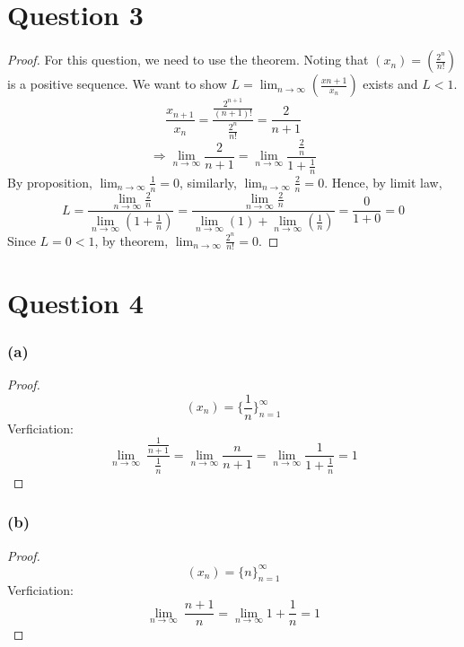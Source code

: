 \documentclass{article}
\begin{document}
\section*{Question 3}
\begin{proof}
    For this question, we need to use the theorem. Noting that \( (x_n) = (\frac{2^n}{n!}) \) is a positive sequence.
    We want to show \( L = \lim_{n \rightarrow \infty} (\frac{x{n + 1}}{x_n}) \) exists and $L < 1$.
    \\
    \[ \frac{x_{n+1}}{x_n} = \frac{\frac{2^{n+1}}{(n+1)!}}{\frac{2^n}{n!}} = \frac{2}{n + 1} \]
    \[ \Rightarrow \lim_{n \rightarrow \infty} \frac{2}{n + 1}  = \lim_{n \rightarrow \infty} \frac{\frac{2}{n}}{1 + \frac{1}{n}} \]
    By proposition, \( \lim_{n \rightarrow \infty} \frac{1}{n} = 0 \), similarly, \( \lim_{n \rightarrow \infty} \frac{2}{n} = 0 \). Hence, by limit law,
    \[ L = \frac{\lim_{n \rightarrow \infty} \frac{2}{n}}{\lim_{n \rightarrow \infty} (1 + \frac{1}{n})} = \frac{\lim_{n \rightarrow \infty} \frac{2}{n}}{\lim_{n \rightarrow \infty} (1) + \lim_{n \rightarrow \infty} (\frac{1}{n})} = \frac{0}{1 + 0} = 0 \]
    Since $L = 0 < 1$, by theorem, \(\lim_{n \rightarrow \infty} \frac{2^n}{n!} = 0\).
\end{proof}

\section*{Question 4}

\subsubsection*{(a)}
\begin{proof}
    \[ (x_n) = \{\frac{1}{n}\}_{n=1}^{\infty} \]
    Verficiation:
    \[ \lim_{n \rightarrow \infty} \ \frac{\frac{1}{n+1}}{\frac{1}{n}} = \lim_{n \rightarrow \infty} \frac{n}{n + 1} = \lim_{n \rightarrow \infty} \frac{1}{1 + \frac{1}{n}} = 1 \]
\end{proof}

\subsubsection*{(b)}
\begin{proof}
    \[ (x_n) = \{n\}_{n=1}^{\infty} \]
    Verficiation:
    \[ \lim_{n \rightarrow \infty} \ \frac{n+1}{n} = \lim_{n \rightarrow \infty} 1 + \frac{1}{n} = 1 \]
\end{proof}
\end{document}
